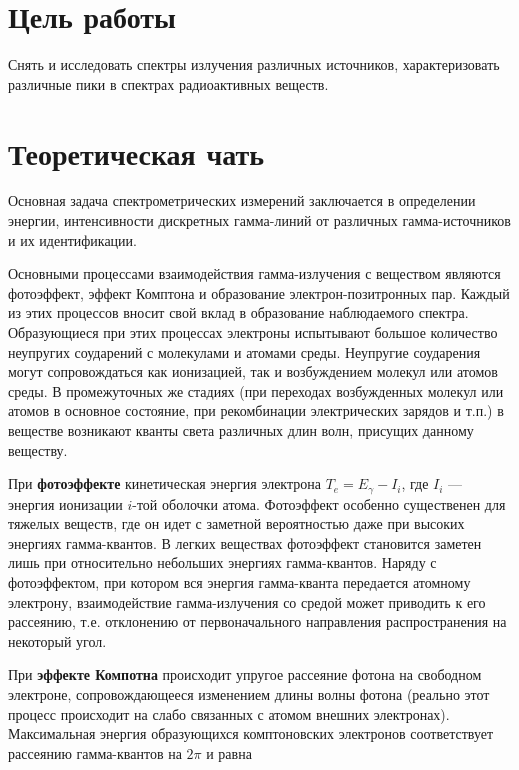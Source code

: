 


    

    \section*{Цель работы}

    Снять и исследовать спектры излучения различных источников, характеризовать различные пики в спектрах радиоактивных веществ.

    \section*{Теоретическая чать}

    Основная задача спектрометрических измерений заключается в определении энергии, интенсивности дискретных гамма-линий от различных гамма-источников и их идентификации.
	
	Основными процессами взаимодействия гамма-излучения с веществом являются фотоэффект, эффект Комптона и образование электрон-позитронных пар. Каждый из этих процессов вносит свой вклад в образование наблюдаемого спектра. Образующиеся при этих процессах электроны испытывают большое количество неупругих соударений с молекулами и атомами среды. Неупругие соударения могут сопровождаться как ионизацией, так и возбуждением молекул или атомов среды. В промежуточных же стадиях (при переходах возбужденных молекул или атомов в основное состояние, при рекомбинации электрических зарядов и т.п.) в веществе возникают кванты света различных длин волн, присущих данному веществу.
	
	При \textbf{фотоэффекте} кинетическая энергия электрона $ T_e = E_{\gamma} - I_i $, где $ I_i $ --- энергия ионизации $ i $-той оболочки атома. Фотоэффект особенно существенен для тяжелых веществ, где он идет с заметной вероятностью даже при высоких энергиях гамма-квантов. В легких веществах фотоэффект становится заметен лишь при относительно небольших энергиях гамма-квантов. Наряду с фотоэффектом, при котором вся энергия гамма-кванта передается атомному электрону, взаимодействие гамма-излучения со средой может приводить к его рассеянию, т.е. отклонению от первоначального направления распространения на некоторый угол.
	
	При \textbf{эффекте Компотна} происходит упругое рассеяние фотона на свободном электроне, сопровождающееся изменением длины волны фотона (реально этот процесс происходит на слабо связанных с атомом внешних электронах). Максимальная энергия образующихся комптоновских электронов соответствует рассеянию гамма-квантов на $ 2\pi $ и равна
	
